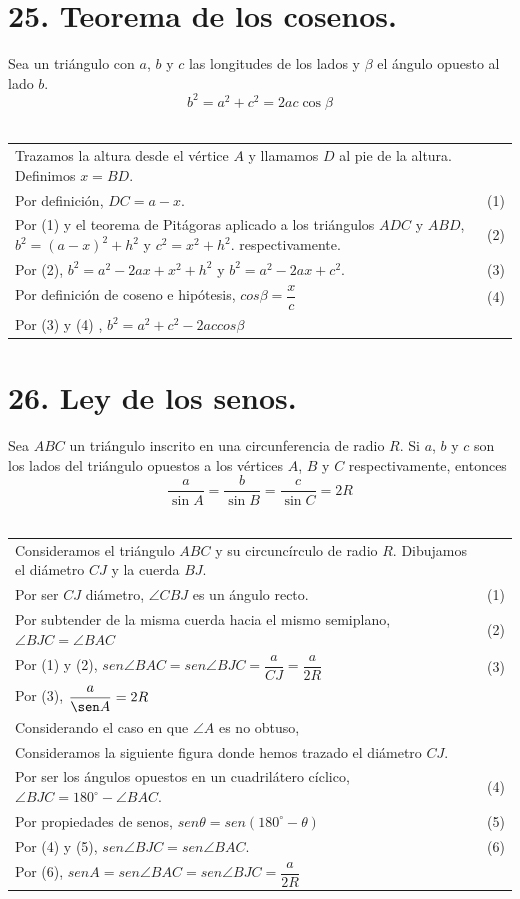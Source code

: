 \documentclass[12pt,a4paper, oneside]{book}
\begin{document}
\section{25. Teorema de los cosenos.}
Sea un triángulo con $a$, $b$ y $c$ las longitudes de los lados y $\beta$ el ángulo opuesto al lado $b$.
$$b^2 = a^2 + c^2 =2ac \cos \beta$$
\\
\begin{tabular}{p{15.9 cm} p{1cm}}
Trazamos la altura desde el vértice $A$ y llamamos $D$ al pie de la altura. Definimos $x=BD$.
\\Por definición, $DC=a-x.$ &(1)
\\Por (1) y el teorema de Pitágoras aplicado a los triángulos $ADC$ y $ABD$, $b^2=(a-x)^2 + h^2$ y $c^2=x^2 +h^2$.  respectivamente. & \medskip (2)
\\Por (2), $b^2=a^2-2ax+x^2+h^2$ y $b^2=a^2- 2ax+c^2$. &(3)
\\Por definición de coseno e hipótesis, $cos\beta = \dfrac{x}{c}$  &(4)
\\Por (3) y (4) , $b^2= a^2 +c^2-2ac cos \beta$
\end{tabular}
\section{26. Ley de los senos.}
Sea $ABC$ un triángulo inscrito en una circunferencia de radio $R$. Si $a$, $b$ y $c$ son los lados del triángulo opuestos a los vértices $A$, $B$ y $C$ respectivamente, entonces$$ \dfrac{a}{\sin A} = \dfrac{b}{\sin B}= \dfrac{c}{\sin C}= 2R$$
\\
\begin{tabular}{p{15.9 cm} p{1cm}}
Consideramos el triángulo $ABC$ y su circuncírculo de radio $R$. Dibujamos el diámetro $CJ$ y la cuerda $BJ$.
\\Por ser $CJ$ diámetro, $\angle CBJ$ es un ángulo recto. &(1)
\\Por subtender de la misma cuerda hacia el mismo  semiplano, $ \angle BJC= \angle BAC$ &(2)
\\Por (1) y (2), $sen \angle BAC = sen \angle BJC = \dfrac{a}{CJ}=\dfrac{a}{2R}$ &(3)
\\ Por (3), $\dfrac{a}{\sen A} = 2R$
\\Considerando el caso en que $\angle A$ es no obtuso, \\Consideramos la siguiente figura donde hemos trazado el diámetro $CJ$.
\\Por ser los ángulos opuestos en un cuadrilátero cíclico, $\angle BJC = 180^{\circ} - \angle BAC$. &(4)
\\Por propiedades de senos, $sen \theta = sen (180^{\circ}-\theta)$ &(5)
\\Por (4) y (5), $sen \angle BJC = sen \angle BAC$. &(6)
\\Por (6), $sen A= sen \angle BAC = sen \angle BJC = \dfrac{a}{2R}$
\end{tabular}
\end{document}
